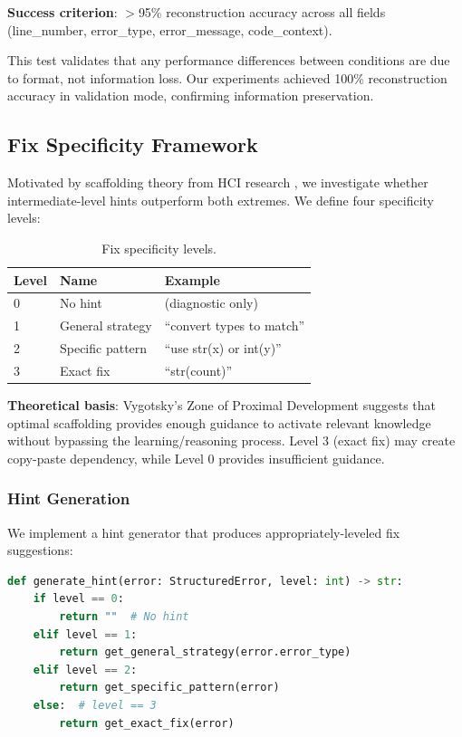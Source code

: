 \textbf{Success criterion}: $>$95\% reconstruction accuracy across all fields (line\_number, error\_type, error\_message, code\_context).

This test validates that any performance differences between conditions are due to format, not information loss. Our experiments achieved 100\% reconstruction accuracy in validation mode, confirming information preservation.

\subsection{Fix Specificity Framework}

Motivated by scaffolding theory from HCI research \citep{vygotsky1978zpd}, we investigate whether intermediate-level hints outperform both extremes. We define four specificity levels:

\begin{table}[H]
\centering
\begin{tabular}{@{}lll@{}}
\toprule
\textbf{Level} & \textbf{Name} & \textbf{Example} \\
\midrule
0 & No hint & (diagnostic only) \\
1 & General strategy & ``convert types to match'' \\
2 & Specific pattern & ``use str(x) or int(y)'' \\
3 & Exact fix & ``str(count)'' \\
\bottomrule
\end{tabular}
\caption{Fix specificity levels.}
\end{table}

\textbf{Theoretical basis}: Vygotsky's Zone of Proximal Development suggests that optimal scaffolding provides enough guidance to activate relevant knowledge without bypassing the learning/reasoning process. Level 3 (exact fix) may create copy-paste dependency, while Level 0 provides insufficient guidance.

\subsubsection{Hint Generation}

We implement a hint generator that produces appropriately-leveled fix suggestions:

\begin{lstlisting}[language=Python]
def generate_hint(error: StructuredError, level: int) -> str:
    if level == 0:
        return ""  # No hint
    elif level == 1:
        return get_general_strategy(error.error_type)
    elif level == 2:
        return get_specific_pattern(error)
    else:  # level == 3
        return get_exact_fix(error)
\end{lstlisting}

